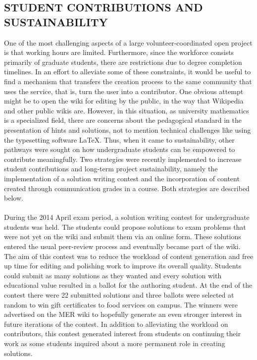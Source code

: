 \documentclass{primus}
\begin{document}
\subsection{STUDENT CONTRIBUTIONS AND SUSTAINABILITY}\label{sec:Student_Contributions_and_Sustainability}
One of the most challenging aspects of a large volunteer-coordinated open project is that working hours are limited. Furthermore, since the workforce consists primarily of graduate students, there are restrictions due to degree completion timelines. In an effort to alleviate some of these constraints, it would be useful to find a mechanism that transfers the creation process to the same community that uses the service, that is, turn the user into a contributor. One obvious attempt might be to open the wiki for editing by the public, in the way that Wikipedia and other public wikis are. However, in this situation, as university mathematics is a specialized field, there are concerns about the pedagogical standard in the presentation of hints and solutions, not to mention technical challenges like using the typesetting software LaTeX. Thus, when it came to sustainability, other pathways were sought on how undergraduate students can be empowered to contribute meaningfully. Two strategies were recently implemented to increase student contributions and long-term project sustainability, namely the implementation of a solution writing contest and the incorporation of content created through communication grades in a course. Both strategies are described below.
\\\\
\noindent{}During the 2014 April exam period, a solution writing contest for undergraduate students was held. The students could propose solutions to exam problems that were not yet on the wiki and submit them via an online form. These solutions entered the usual peer-review process and eventually became part of the wiki. The aim of this contest was to reduce the workload of content generation and free up time for editing and polishing work to improve its overall quality. Students could submit as many solutions as they wanted and every solution with educational value resulted in a ballot for the authoring student. At the end of the contest there were 22 submitted solutions and three ballots were selected at random to win gift certificates to food services on campus. The winners were advertised on the MER wiki to hopefully generate an even stronger interest in future iterations of the contest. In addition to alleviating the workload on contributors, this contest generated interest from students on continuing their work as some students inquired about a more permanent role in creating solutions.
\end{document}
